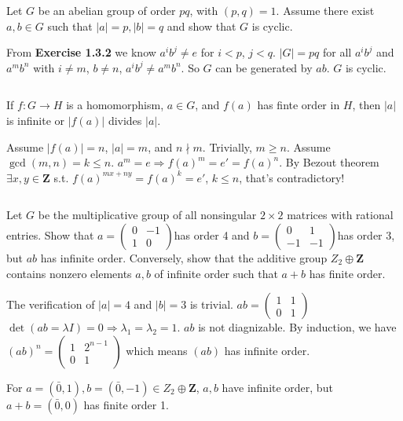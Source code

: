 $$ $$

\begin{ex}
    Let $G$ be an abelian group of order $pq$, with $(p,q)=1$. Assume there exist $a,b\in G$ such that $\left| a \right| =p, \left| b \right| =q$ and show that $G$ is cyclic.
\end{ex}

\begin{answer}
    From \textbf{Exercise 1.3.2} we know $a^{i}b^{j}\neq e$ for $i<p$, $j<q$. $\left| G \right| =pq$ for all $a^{i}b^{j}$ and $a^{m}b^{n}$ with $i\neq m$, $b\neq n$, $a^{i}b^{j}\neq a^{m}b^{n}$. So $G$ can be generated by $ab$. $G$ is cyclic.
\end{answer}

$$ $$

\begin{ex}
    If $f:G\to H$ is a homomorphism, $a\in G$, and $f(a)$ has finte order in $H$, then $\left| a \right| $ is infinite or $\left| f(a) \right| $ divides $\left| a \right| $.
\end{ex}

\begin{answer}
    Assume $\left| f(a) \right| =n$, $\left| a \right| =m$, and $n\nmid m$. Trivially, $m\geq n$. Assume $\gcd(m,n)=k\leq n$. $a^{m}=e\Rightarrow f(a)^{m}=e'=f(a)^{n}$. By Bezout theorem $\exists x,y\in \mathbf{Z}$ s.t. $f(a)^{mx+ny}=f(a)^{k}=e'$, $k\leq n$, that's contradictory!
\end{answer}

$$ $$

\begin{ex}
    Let $G$ be the multiplicative group of all nonsingular $2\times 2$ matrices with rational entries. Show that $a=\begin{pmatrix}
        0 & -1\\1 & 0
    \end{pmatrix}$has order 4 and $b=\begin{pmatrix}
        0& 1\\-1&-1
    \end{pmatrix}$has order 3, but $ab$ has infinite order. Conversely, show that the additive group $Z_{2}\oplus \mathbf{Z}$ contains nonzero elements $a,b$ of infinite order such that $a+b$ has finite order. 
\end{ex}

\begin{answer}
    The verification of $\left| a \right| =4$ and $\left| b \right| =3$ is trivial. $ab=\begin{pmatrix}
        1 & 1\\ 0& 1
    \end{pmatrix}$ $\det(ab=\lambda I)=0\Rightarrow \lambda_{1}=\lambda_{2}=1$. $ab$ is not diagnizable. By induction, we have $(ab)^{n}=\begin{pmatrix}
        1 & 2^{n-1}\\ 0& 1
    \end{pmatrix}$ which means $(ab)$ has infinite order.

    For $a=(\bar{0},1), b=(\bar{0},-1)\in Z_{2}\oplus\mathbf{Z}$, $a,b$ have infinite order, but $a+b=(\bar{0},0)$ has finite order 1.
\end{answer}

